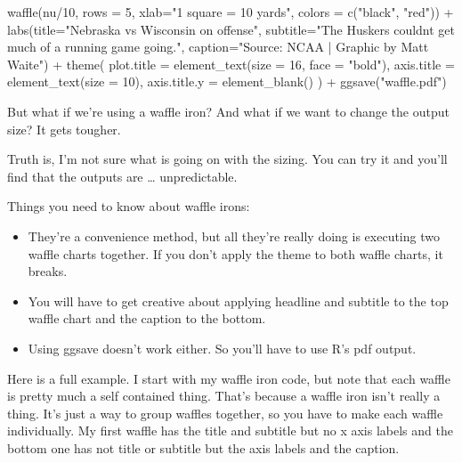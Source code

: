 \documentclass[
]{book}
\newenvironment{Shaded}{\begin{snugshade}}{\end{snugshade}}
\newcommand{\AttributeTok}[1]{\textcolor[rgb]{0.77,0.63,0.00}{#1}}
\newcommand{\DecValTok}[1]{\textcolor[rgb]{0.00,0.00,0.81}{#1}}
\newcommand{\FunctionTok}[1]{\textcolor[rgb]{0.00,0.00,0.00}{#1}}
\newcommand{\NormalTok}[1]{#1}
\newcommand{\SpecialCharTok}[1]{\textcolor[rgb]{0.00,0.00,0.00}{#1}}
\newcommand{\StringTok}[1]{\textcolor[rgb]{0.31,0.60,0.02}{#1}}
\providecommand{\tightlist}{%
  \setlength{\itemsep}{0pt}\setlength{\parskip}{0pt}}
\begin{document}
\begin{Shaded}
\begin{Highlighting}[]
\FunctionTok{waffle}\NormalTok{(nu}\SpecialCharTok{/}\DecValTok{10}\NormalTok{, }\AttributeTok{rows =} \DecValTok{5}\NormalTok{, }\AttributeTok{xlab=}\StringTok{"1 square = 10 yards"}\NormalTok{, }\AttributeTok{colors =} \FunctionTok{c}\NormalTok{(}\StringTok{"black"}\NormalTok{, }\StringTok{"red"}\NormalTok{)) }\SpecialCharTok{+} \FunctionTok{labs}\NormalTok{(}\AttributeTok{title=}\StringTok{"Nebraska vs Wisconsin on offense"}\NormalTok{, }\AttributeTok{subtitle=}\StringTok{"The Huskers couldn\textquotesingle{}t get much of a running game going."}\NormalTok{, }\AttributeTok{caption=}\StringTok{"Source: NCAA | Graphic by Matt Waite"}\NormalTok{) }\SpecialCharTok{+} 
  \FunctionTok{theme}\NormalTok{(}
    \AttributeTok{plot.title =} \FunctionTok{element\_text}\NormalTok{(}\AttributeTok{size =} \DecValTok{16}\NormalTok{, }\AttributeTok{face =} \StringTok{"bold"}\NormalTok{),}
    \AttributeTok{axis.title =} \FunctionTok{element\_text}\NormalTok{(}\AttributeTok{size =} \DecValTok{10}\NormalTok{),}
    \AttributeTok{axis.title.y =} \FunctionTok{element\_blank}\NormalTok{()}
\NormalTok{  ) }\SpecialCharTok{+} \FunctionTok{ggsave}\NormalTok{(}\StringTok{"waffle.pdf"}\NormalTok{)}
\end{Highlighting}
\end{Shaded}

But what if we're using a waffle iron? And what if we want to change the output size? It gets tougher.

Truth is, I'm not sure what is going on with the sizing. You can try it and you'll find that the outputs are \ldots{} unpredictable.

Things you need to know about waffle irons:

\begin{itemize}
\tightlist
\item
  They're a convenience method, but all they're really doing is executing two waffle charts together. If you don't apply the theme to both waffle charts, it breaks.
\item
  You will have to get creative about applying headline and subtitle to the top waffle chart and the caption to the bottom.
\item
  Using ggsave doesn't work either. So you'll have to use R's pdf output.
\end{itemize}

Here is a full example. I start with my waffle iron code, but note that each waffle is pretty much a self contained thing. That's because a waffle iron isn't really a thing. It's just a way to group waffles together, so you have to make each waffle individually. My first waffle has the title and subtitle but no x axis labels and the bottom one has not title or subtitle but the axis labels and the caption.
\end{document}
